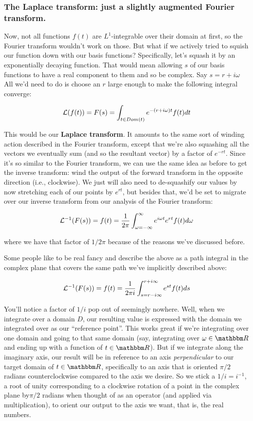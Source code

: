 \documentclass[../main/main.tex]{subfiles}
\begin{document}
\subsubsection{The Laplace transform: just a slightly augmented Fourier transform.}

Now, not all functions \(f(t)\)
are \(L^1\)-integrable over their domain
at first, so the Fourier transform wouldn't work on those. 
But what if we actively tried to squish our 
function down with our basis functions? Specifically,
let's squash it by an exponentially decaying function.
That would mean allowing \(s\) of our basis functions 
to have a real component to them and so be complex.
Say \(s = r + i\omega\)
All we'd need to do is choose an \(r\) large enough to
make the following integral converge:

\[ \mathcal{L}(f(t)) = F(s) = \int_{t \in Dom(t)} e^{-(r + i\omega)t} f(t) dt \]

This would be our \textbf{Laplace transform}. It amounts
to the same sort of winding action described in the Fourier
transform, except that we're also squashing all the vectors
we eventually sum (and so the resultant vector)
by a factor of \(e^{-rt}\). Since it's so similar to
the Fourier transform, we can use the same idea as
before to get the inverse transform: wind the output
of the forward transform in the opposite direction
(i.e., clockwise). We just will also need to de-squashify
our values by now stretching each of our points by
\(e^{rt}\), but besides that, we'd be set to migrate
over our inverse transform from our analysis of the Fourier
transform:

\[ \mathcal{L}^{-1}(F(s)) = f(t) = \frac{1}{2\pi} \int_{\omega = -\infty}^{\infty} e^{i\omega t} e^{rt} f(t) d\omega \]

where we have that factor of \(1/2\pi\) because of the reasons
we've discussed before.\par

Some people like to be real fancy and describe the above
as a path integral in the complex plane that covers the
same path we've implicitly described above:

\[ \mathcal{L}^{-1}(F(s)) = f(t) = \frac{1}{2\pi i} \int_{s = r - i\infty}^{r + i\infty} e^{st} f(t) ds \]

You'll notice a factor of \(1/i\) pop out of seemingly
nowhere.
Well, when we integrate over a domain \(D\),
our resulting value is expressed with the domain we integrated
over as our ``reference point''. This works great if
we're integrating over one domain and going to
that same domain (say, integrating over \(\omega \in \domain{R}\)
and ending up with a function of \(t \in \domain{R}\)).
But if we integrate along the imaginary axis, our result
will be in reference to an axis \emph{perpendicular} to
our target domain of \(t \in \domain{R}\), specifically
to an axis that is oriented \(\pi/2\) radians counterclockwise
compared to the axis we desire. So we stick
a \(1/i = i^{-1}\), a root of unity corresponding
to a clockwise rotation of a point in the
complex plane by\(\pi/2\) radians 
when thought of as an operator (and applied via multiplication),
to orient our output to the axis we want, that is, the
real numbers.
\\
\end{document}
